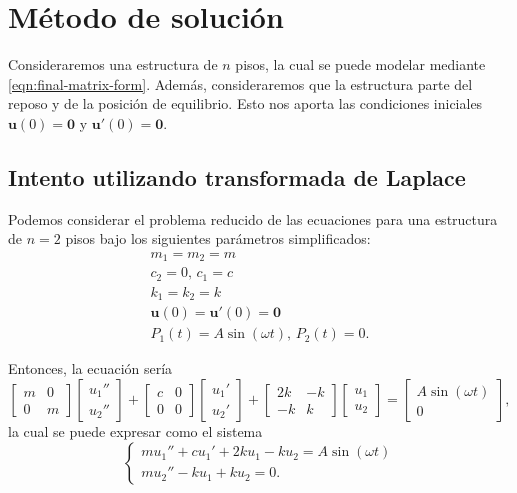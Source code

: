 \section{Método de solución}

Consideraremos una estructura de \(n\) pisos, la cual se puede modelar mediante \eqref{eqn:final-matrix-form}. Además, consideraremos que la estructura parte del reposo y de la posición de equilibrio. Esto nos aporta las condiciones iniciales \(\mathbf{u}(0) = \mathbf{0}\) y \(\mathbf{u}'(0) = \mathbf{0}\).

\subsection{Intento utilizando transformada de Laplace}

Podemos considerar el problema reducido de las ecuaciones para una estructura de \(n = 2\) pisos bajo los siguientes parámetros simplificados:
\begin{gather}
    m_1 = m_2 = m \\
    c_2 = 0, \, c_1 = c \\
    k_1 = k_2 = k \\
    \mathbf{u}(0) = \mathbf{u}'(0) = \mathbf{0} \\
    P_1(t) = A\sin(\omega t), \, P_2(t) = 0
.\end{gather}

Entonces, la ecuación sería
\[
    \begin{bmatrix}
        m & 0 \\
        0 & m
    \end{bmatrix} \begin{bmatrix} u_1'' \\ u_2'' \end{bmatrix}
    + \begin{bmatrix}
        c & 0 \\
        0 & 0
    \end{bmatrix} \begin{bmatrix} u_1' \\ u_2' \end{bmatrix}
    + \begin{bmatrix}
        2k & -k \\
        -k & k
    \end{bmatrix} \begin{bmatrix} u_1 \\ u_2 \end{bmatrix}
    = \begin{bmatrix} A\sin(\omega t) \\ 0 \end{bmatrix}
,\]
la cual se puede expresar como el sistema
\[
    \begin{cases}
        mu_1'' + cu_1' + 2ku_1 - ku_2 = A\sin(\omega t) \\
        mu_2'' - ku_1 + ku_2 = 0
    .\end{cases}
\]

